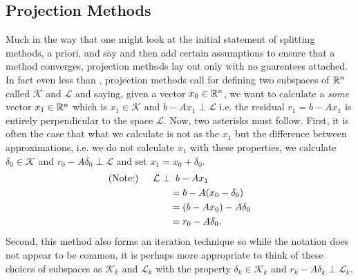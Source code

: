 \documentclass[11pt]{article}
\begin{document}
\subsection{Projection Methods}

Much in the way that one might look at the initial statement of splitting methods, a priori, and say  and then add certain assumptions to ensure that a method converges, projection methods lay out only  with no guarentees attached. In fact even less than , projection methods call for defining two subspaces of $\mathbb{R}^n$ called $\mathcal{K}$ and $\mathcal{L}$ and saying, given a vector $x_0 \in \mathbb{R}^{n}$, we want to calculate a \emph{some} vector $x_1 \in \mathbb{R}^{n}$ which is $x_1 \in \mathcal{K}$ and $ b - Ax_1 \perp \mathcal{L}$ i.e. the residual $r_1 = b - Ax_1$ is entirely perpendicular to the space $\mathcal{L}$. Now, two asterisks must follow. First, it is often the case that what we calculate is not as the  $x_1$ but the difference between approximations, i.e. we do not calculate $x_1$ with these properties, we calculate $\delta_0 \in \mathcal{K}$ and $r_0 - A\delta_0 \perp \mathcal L$ and set $x_1 = x_0 + \delta_0$. \begin{align*}
\text{(Note:)} \hspace{1.5em} \mathcal{L} \perp &\hspace{0.6em} b - Ax_1 \\
&= b - A(x_0 - \delta_0) \\
&= (b - Ax_0) - A\delta_0 \\
&= r_0 - A \delta_0.
\end{align*}
Second, this method also forms an iteration technique so while the notation does not appear to be common, it is perhaps more appropriate to think of these choices of subspaces as $\mathcal{K}_k$ and $\mathcal{L}_k$ with the property $\delta_k \in \mathcal{K}_k$ and $r_k - A \delta_k \perp \mathcal{L}_k$.
\end{document}
